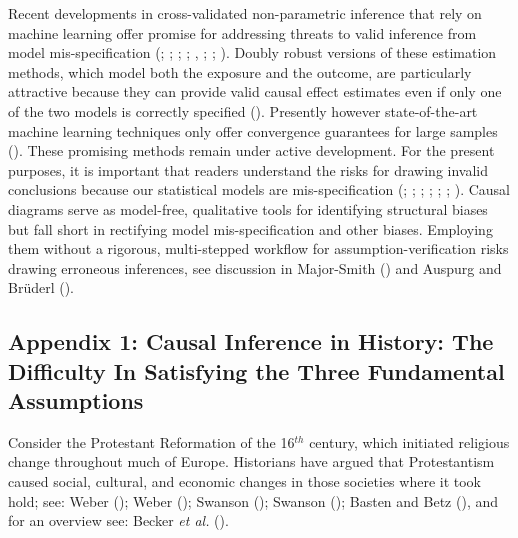 \documentclass[
  singlecolumn]{article}
\begin{document}
Recent developments in cross-validated non-parametric inference that
rely on machine learning offer promise for addressing threats to valid
inference from model mis-specification (; ; ;
;
,
; ; ).
Doubly robust versions of these estimation methods, which model both the
exposure and the outcome, are particularly attractive because they can
provide valid causal effect estimates even if only one of the two models
is correctly specified (). Presently however state-of-the-art machine learning
techniques only offer convergence guarantees for large samples
(). These
promising methods remain under active development. For the present
purposes, it is important that readers understand the risks for drawing
invalid conclusions because our statistical models are mis-specification
(;
;
;
;
;
;
). Causal diagrams
serve as model-free, qualitative tools for identifying structural biases
but fall short in rectifying model mis-specification and other biases.
Employing them without a rigorous, multi-stepped workflow for
assumption-verification risks drawing erroneous inferences, see
discussion in Major-Smith () and
Auspurg and Brüderl ().

\subsection{Appendix 1: Causal Inference in History: The Difficulty In
Satisfying the Three Fundamental
Assumptions}\label{appendix-1-causal-inference-in-history-the-difficulty-in-satisfying-the-three-fundamental-assumptions}

Consider the Protestant Reformation of the 16\(^{th}\) century, which
initiated religious change throughout much of Europe. Historians have
argued that Protestantism caused social, cultural, and economic changes
in those societies where it took hold; see: Weber
(); Weber
(); Swanson
(); Swanson
(); Basten and Betz
(), and for an overview see: Becker
\emph{et al.} ().
\end{document}
